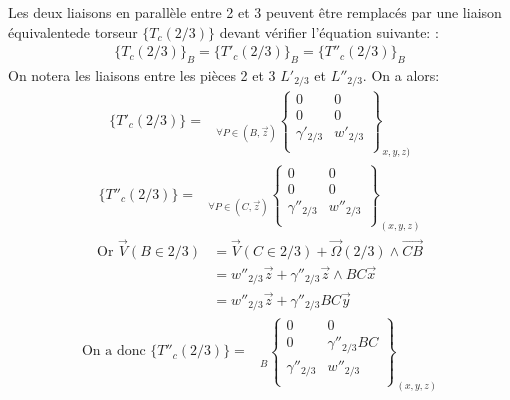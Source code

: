 \documentclass[12pt,a4paper]{report}
\begin{document}
	Les deux liaisons en parallèle entre 2 et 3 peuvent être remplacés par une liaison équivalentede torseur $\{ T_c (2/3) \}$ devant vérifier l'équation suivante: : 
	\begin{align*}
\{ T_c (2/3) \}_{B} = \{ T'_c (2/3) \}_{B} = \{ T''_c (2/3) \}_{B}
\end{align*}
On notera les liaisons entre les pièces 2 et 3 $L'_{2/3}$ et $L''_{2/3}$. On a alors:
\begin{align*}
\{ T'_c (2/3) \} =
\begin{array}{c}
	\\ \\ \\ 
\end{array} _{\forall P \in (B,\overrightarrow{z})}
\left\{
\begin{array}{cc}
	0 & 0 \\
	0 & 0 \\
	\gamma'_{2/3} & w'_{2/3} \\
\end{array}
\right\} _{x,y,z)}
\end{align*} 
\begin{align*}
\{ T''_c (2/3) \} = 
\begin{array}{c}
	\\ \\ \\ 
\end{array} _{\forall P \in (C, \overrightarrow{z})}
\left\{
\begin{array}{cc}
	0 & 0 \\
	0 & 0 \\
	\gamma''_{2/3} & w''_{2/3} \\
\end{array}
\right\} _{(x, y, z)}
\end{align*}
\begin{align*}
\mbox{Or } \overrightarrow{V}(B \in 2/3) 
&= \overrightarrow{V}(C \in 2/3)+\overrightarrow{\Omega}(2/3) \wedge \overrightarrow{CB}\\ 
&= w''_{2/3} \overrightarrow{z} + \gamma''_{2/3} \overrightarrow{z} \wedge BC \overrightarrow{x} \\
&= w''_{2/3} \overrightarrow{z} + \gamma''_{2/3}BC \overrightarrow{y}
\end{align*} 
\begin{align*}
\mbox{On a donc }
\{ T''_c (2/3) \} = 
\begin{array}{c}
	\\ \\ \\ 
\end{array} _{B}
\left\{
\begin{array}{cc}
	0 & 0 \\
	0 & \gamma''_{2/3}BC \\
	\gamma''_{2/3} & w''_{2/3} \\
\end{array}
\right\} _{(x, y, z)}
\end{align*}
\end{document}
